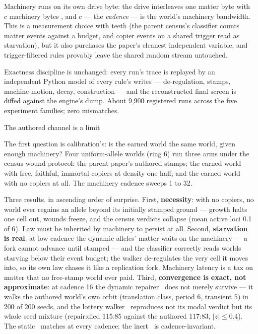 Machinery runs on its own drive byte: the drive interleaves one
matter byte  with $c$ machinery bytes , and $c$ --- the
{\it cadence} --- is the world's machinery bandwidth. This is a
measurement choice with teeth (the parent census's classifier
counts matter events against a budget, and copier events on a
shared trigger read as starvation), but it also purchases the
paper's cleanest independent variable, and trigger-filtered rules
provably leave the shared random stream untouched.

Exactness discipline is unchanged: every run's trace is replayed
by an independent Python model of every rule's writes ---
de-regulation, stamps, machine motion, decay, construction ---
and the reconstructed final screen is diffed against the engine's
dump. About 9{,}900 registered runs across the five experiment
families; zero mismatches.

\sec The authored channel is a limit

The first question is calibration's: is the earned world the same
world, given enough machinery? Four uniform-allele worlds (ring
6) run three arms under the census wound protocol: the parent
paper's authored stamps; the earned world with free, faithful,
immortal copiers at density one half; and the earned world with
no copiers at all. The machinery cadence sweeps 1 to 32.

\medskip\centerline{\picw=10.5cm }
\medskip

Three results, in ascending order of surprise. First, {\bf
necessity}: with no copiers, no world ever regains an allele
beyond its initially stamped ground --- growth halts one cell out,
wounds freeze, and the census verdicts collapse (mean active loci
0.1 of 6). Law must be inherited by machinery to persist at all.
Second, {\bf starvation is real}: at low cadence the dynamic
alleles' matter waits on the machinery --- a fork cannot advance
until stamped --- and the classifier correctly reads worlds
starving below their event budget; the walker de-regulates the
very cell it moves into, so its own law chases it like a
replication fork. Machinery latency is a tax on matter that no
free-stamp world ever paid. Third, {\bf convergence is exact, not
approximate}: at cadence 16 the dynamic repairer \lb\ does not
merely survive --- it walks the authored world's own orbit
(translation class, period 6, transient 5) in 200 of 200 seeds,
and the lottery walker \lc\ reproduces not its modal verdict but
its whole seed mixture (repair:died 115:85 against the authored
117:83, $|z|\le0.4$). The static \la\ matches at every cadence;
the inert \ld\ is cadence-invariant.

